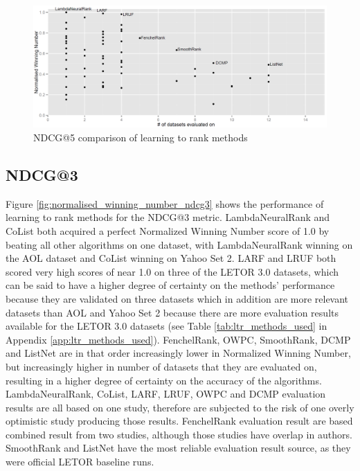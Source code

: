 \documentclass{sig-alternate-2013}
\begin{document}
\begin{figure}
\includegraphics[scale=0.371]{gfx/ndcg5_winnum}
\caption{NDCG@5 comparison of learning to rank methods}
\label{fig:normalised_winning_number_ndcg5}
\end{figure}
\subsection{NDCG@3}
Figure \ref{fig:normalised_winning_number_ndcg3} shows the performance of learning to rank methods for the NDCG@3 metric. LambdaNeuralRank and CoList both acquired a perfect Normalized Winning Number score of 1.0 by beating all other algorithms on one dataset, with LambdaNeuralRank winning on the AOL dataset and CoList winning on Yahoo Set 2. LARF and LRUF both scored very high scores of near 1.0 on three of the LETOR 3.0 datasets, which can be said to have a higher degree of certainty on the methods' performance because they are validated on three datasets which in addition are more relevant datasets than AOL and Yahoo Set 2 because there are more evaluation results available for the LETOR 3.0 datasets (see Table \ref{tab:ltr_methods_used} in Appendix \ref{app:ltr_methods_used}). FenchelRank, OWPC, SmoothRank, DCMP and ListNet are in that order increasingly lower in Normalized Winning Number, but increasingly higher in number of datasets that they are evaluated on, resulting in a higher degree of certainty on the accuracy of the algorithms.\\

LambdaNeuralRank, CoList, LARF, LRUF, OWPC and DCMP evaluation results are all based on one study, therefore are subjected to the risk of one overly optimistic study producing those results. FenchelRank evaluation result are based combined result from two studies, although those studies have overlap in authors. SmoothRank and ListNet have the most reliable evaluation result source, as they were official LETOR baseline runs.  
\end{document}
